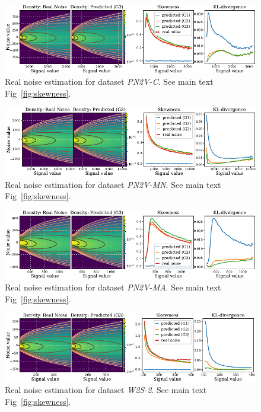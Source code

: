 \documentclass{article}
\begin{document}
\begin{figure}[ht]
\begin{center}
\centerline{\includegraphics[width=\columnwidth]{fig_skewness_1col_pn2v-C.pdf}}
\caption{Real noise estimation for dataset \textit{PN2V-C}. See main text Fig~\ref{fig:skewness}.
}
\end{center}
\end{figure}

\begin{figure}[ht]
\begin{center}
\centerline{\includegraphics[width=\columnwidth]{fig_skewness_1col_pn2v-MN.pdf}}
\caption{Real noise estimation for dataset \textit{PN2V-MN}. See main text Fig~\ref{fig:skewness}.
}
\end{center}
\end{figure}

\begin{figure}[ht]
\begin{center}
\centerline{\includegraphics[width=\columnwidth]{fig_skewness_1col_pn2v-MA.pdf}}
\caption{Real noise estimation for dataset \textit{PN2V-MA}. See main text Fig~\ref{fig:skewness}.
}
\end{center}
\end{figure}

\begin{figure}[ht]
\begin{center}
\centerline{\includegraphics[width=\columnwidth]{fig_skewness_1col_w2s-2.pdf}}
\caption{Real noise estimation for dataset \textit{W2S-2}. See main text Fig~\ref{fig:skewness}.
}
\end{center}
\end{figure}
\end{document}
